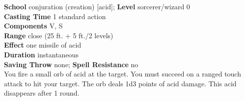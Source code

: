 \textbf{School} conjuration (creation) [acid]; \textbf{Level} sorcerer/wizard 0\\
\textbf{Casting Time} 1 standard action\\
\textbf{Components} V, S\\
\textbf{Range} close (25 ft. + 5 ft./2 levels)\\
\textbf{Effect} one missile of acid\\
\textbf{Duration} instantaneous\\
\textbf{Saving Throw} none; \textbf{Spell Resistance} no\\
You fire a small orb of acid at the target. You must succeed on a ranged touch attack to hit your target. The orb deals 1d3 points of acid damage. This acid disappears after 1 round.\\
